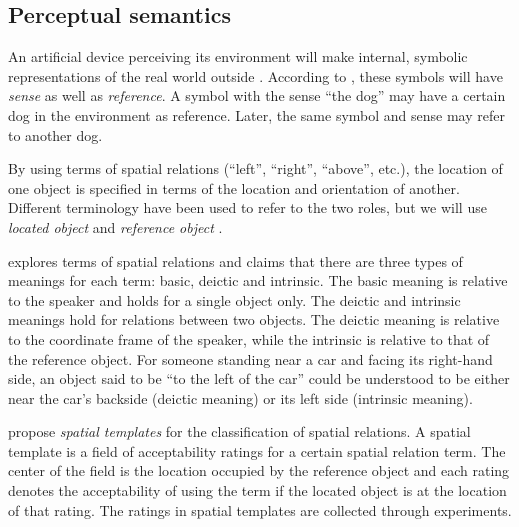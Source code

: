 \subsection{Perceptual semantics}
\label{sec:percsem}

An artificial device perceiving its environment will make internal, symbolic representations of the real world outside \citep{PustejovskyPerceptualsemanticsconstruction1990}.
According to \cite{FregeUberSinnUnd1892}, these symbols will have \textit{sense} as well as \textit{reference}.
A symbol with the sense ``the dog'' may have a certain dog in the environment as reference.
Later, the same symbol and sense may refer to another dog.

By using terms of spatial relations (``left'', ``right'', ``above'', etc.), the location of one object is specified in terms of the location and orientation of another.
Different terminology have been used to refer to the two roles, but we will use \textit{located object} and \textit{reference object} \citep{DobnikModellinglanguageaction2012}.

\cite{Garnhamunifiedtheorymeaning1989} explores terms of spatial relations and claims that there are three types of meanings for each term: basic, deictic and intrinsic.
The basic meaning is relative to the speaker and holds for a single object only.
The deictic and intrinsic meanings hold for relations between two objects.
The deictic meaning is relative to the coordinate frame of the speaker, while the intrinsic is relative to that of the reference object.
For someone standing near a car and facing its right-hand side, an object said to be ``to the left of the car'' could be understood to be either near the car's backside (deictic meaning) or its left side (intrinsic meaning).


\cite{LoganComputationalAnalysisApprehension1996} propose \textit{spatial templates} for the classification of spatial relations.
A spatial template is a field of acceptability ratings for a certain spatial relation term.
The center of the field is the location occupied by the reference object and each rating denotes the acceptability of using the term if the located object is at the location of that rating.
The ratings in spatial templates are collected through experiments.

